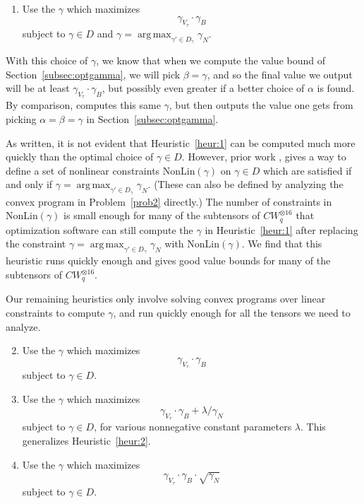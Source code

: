 \documentclass{theoretics}
\DeclareMathOperator*{\argmax}{arg\,max}
\begin{document}
\begin{enumerate}[label={\lsstyle\interextrabold\fontsize{12}{12}\selectfont HEURISTIC \arabic*.},  align= left, itemsep=1em, labelindent = 0em,ref=\arabic*]  
\item \label{heur:1} Use the $\gamma$ which maximizes $$\gamma_{V_\tau} \cdot \gamma_B$$ subject to $\gamma \in D$ and $\gamma = \argmax_{\gamma' \in D_\gamma} \gamma_N$.
\end{enumerate}
With this choice of $\gamma$, we know that when we compute the value bound of Section~\ref{subsec:optgamma}, we will pick $\beta = \gamma$, and so the final value we output will be at least $\gamma_{V_\tau} \cdot \gamma_B$, but possibly even greater if a better choice of $\alpha$ is found. By comparison, \cite[{Algorithm~B}]{legall} computes this same $\gamma$, but then outputs the value one gets from picking $\alpha=\beta=\gamma$ in Section~\ref{subsec:optgamma}.

As written, it is not evident that Heuristic~\ref{heur:1} can be computed much more quickly than the optimal choice of $\gamma \in D$.
However, prior work \cite[{Figure~1}]{v12}, \cite[{Proposition~4.1}]{legall} gives a way to define a set of nonlinear constraints NonLin$(\gamma)$ on $\gamma \in D$ which are satisfied if and only if $\gamma = \argmax_{\gamma' \in D_\gamma} \gamma_N$. (These can also be defined by analyzing the convex program in Problem~\ref{prob2} directly.) The number of constraints in NonLin$(\gamma)$ is small enough for many of the subtensors of $CW_q^{\otimes 16}$ that optimization software can still compute the $\gamma$ in Heuristic~\ref{heur:1} after replacing the constraint $\gamma = \argmax_{\gamma' \in D_\gamma} \gamma_N$ with NonLin$(\gamma)$. We find that this heuristic runs quickly enough and gives good value bounds for many of the subtensors of $CW_q^{\otimes 16}$.

Our remaining heuristics only involve solving convex programs over linear constraints to compute $\gamma$, and run quickly enough for all the tensors we need to analyze.



\begin{enumerate}[label={\lsstyle\interextrabold\fontsize{12}{12}\selectfont HEURISTIC \arabic*.},  align= left, itemsep=1em, labelindent = 0em,ref=\arabic*]  \setcounter{enumi}{1}
     \item \label{heur:2} Use the $\gamma$ which maximizes  $$\gamma_{V_\tau} \cdot \gamma_B$$ subject to $\gamma \in D$.
     \item\label{heur:3} Use the $\gamma$ which maximizes  $$\gamma_{V_\tau} \cdot \gamma_B + \lambda/\gamma_N$$ subject to $\gamma \in D$, for various nonnegative constant parameters $\lambda$. This generalizes Heuristic~\ref{heur:2}. 
     \item\label{heur:4} Use the $\gamma$ which maximizes  $$\gamma_{V_\tau} \cdot \gamma_B \cdot \sqrt{\gamma_N}$$ subject to $\gamma \in D$.
\end{enumerate}
\end{document}
